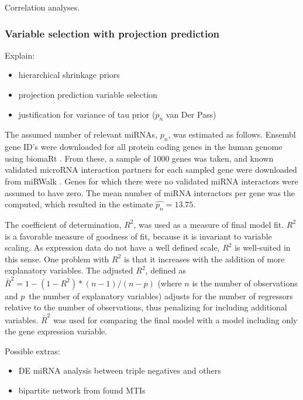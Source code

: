 Correlation analyses.


\subsubsection{Variable selection with projection prediction}

Explain:
\begin{itemize}
  \item hierarchical shrinkage priors
  \item projection prediction variable selection
  \item justification for variance of tau prior ($p_n$ van Der Pass)
\end{itemize}

The assumed number of relevant miRNAs, $p_n$, was estimated as follows.
Ensembl gene ID's were downloaded for all protein coding genes in the human
genome using biomaRt \citep{biomaRt}. From these, a sample of 1000 genes was
taken, and known validated microRNA interaction partners for each sampled gene
were downloaded from miRWalk \citep{miRWalk}. Genes for which there were no
validated miRNA interactors were assumed to have zero. The mean number of
miRNA interactors per gene was the computed, which resulted in the estimate
$\hat{p_n} = 13.75$.

The coefficient of determination, $R^2$, was used as a measure of final model
fit. $R^2$ is a favorable measure of goodness of fit, because it is invariant
to variable scaling. As expression data do not have a well defined scale,
$R^2$ is well-suited in this sense. One problem with $R^2$ is that it
increases with the addition of more explanatory variables. The adjusted $R^2$,
defined as $\bar{R}^2 = 1-(1-R^2)*(n-1)/(n-p)$ (where $n$ is the number of
observations and $p$ the number of explanatory variables) adjusts for the
number of regressors relative to the number of observations, thus penalizing
for including additional variables. $\bar{R}^2$ was used for comparing the
final model with a model including only the gene expression variable.

Possible extras:
\begin{itemize}
	\item DE miRNA analysis between triple negatives and others
	\item bipartite network from found MTIs
\end{itemize}
